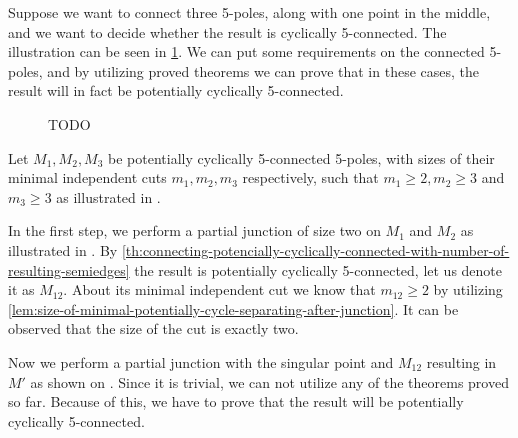 \documentclass[12pt, twoside]{book}
\begin{document}
\begin{example}
	Suppose we want to connect three 5-poles, along with one point in the middle, and we want to decide whether the result is cyclically 5-connected. The illustration can be seen in \cref{fig:3-5-poles-connected}. We can put some requirements on the connected 5-poles, and by utilizing proved theorems we can prove that in these cases, the result will in fact be potentially cyclically 5-connected.
	
	\begin{figure}
		\centering
		\caption{TODO}
		\label{fig:3-5-poles-connected}
	\end{figure}
	
	Let $M_1,M_2,M_3$ be potentially cyclically 5-connected 5-poles, with sizes of their minimal independent cuts $m_1,m_2,m_3$ respectively, such that $m_1\geq 2,m_2\geq 3$ and $m_3\geq 3$ as illustrated in .
	
	In the first step, we perform a partial junction of size two on $M_1$ and $M_2$ as illustrated in . By \cref{th:connecting-potencially-cyclically-connected-with-number-of-resulting-semiedges} the result is potentially cyclically 5-connected, let us denote it as $M_{12}$. About its minimal independent cut we know that $m_{12}\geq 2$ by utilizing \cref{lem:size-of-minimal-potentially-cycle-separating-after-junction}. It can be observed that the size of the cut is exactly two.
	
	Now we perform a partial junction with the singular point and $M_{12}$ resulting in $M'$ as shown on . Since it is trivial, we can not utilize any of the theorems proved so far. Because of this, we have to prove that the result will be potentially cyclically 5-connected.
	

\end{example}
\end{document}
